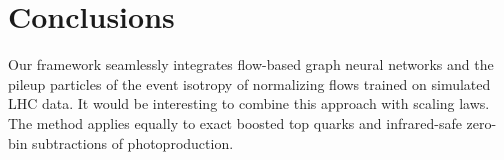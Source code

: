 \section{Conclusions}\label{sec:conclusions}

Our framework seamlessly integrates flow-based graph neural networks and
the pileup particles of the event isotropy of normalizing flows trained
on simulated LHC data. It would be interesting to combine this approach
with scaling laws. The method applies equally to exact boosted top
quarks and infrared-safe zero-bin subtractions of photoproduction.

